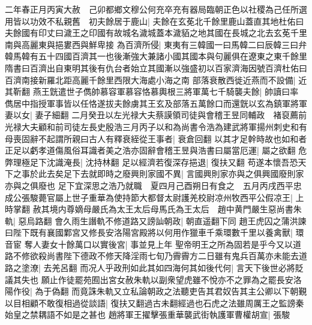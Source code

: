 二年春正月丙寅大赦　己卯都鄉文穆公何充卒充有器局臨朝正色以社稷為己任所選用皆以功效不私親舊　初夫餘居于鹿山|{
	夫餘在玄莬北千餘里鹿山蓋直其地杜佑曰夫餘國有印丈曰濊王之印國有故城名濊城蓋本濊貊之地其國在長城之北去玄莬千里南與高麗東與挹婁西與鮮卑接}
為百濟所侵|{
	東夷有三韓國一曰馬韓二曰辰韓三曰弁韓馬韓有五十四國百濟其一也後漸強大兼諸小國其國本與句麗俱在遼東之東千餘里隋書曰百濟出自東明其後有仇台者始立其國漸以強盛初以百家濟海因號百濟杜佑曰百濟南接新羅北距高麗千餘里西限大海處小海之南}
部落衰散西徙近燕而不設備|{
	近其靳翻}
燕王皝遣世子儁帥慕容軍慕容恪慕輿根三將軍萬七千騎襲夫餘|{
	帥讀曰率}
儁居中指授軍事皆以任恪遂拔夫餘虜其王玄及部落五萬餘口而還皝以玄為鎮軍將軍妻以女|{
	妻子細翻}
二月癸丑以左光禄大夫蔡謨領司徒與會稽王昱同輔政　褚裒薦前光禄大夫顧和前司徒左長史殷浩三月丙子以和為尚書令浩為建武將軍揚州刺史和有母喪固辭不起謂所親曰古人有釋衰絰從王事者|{
	衰倉回翻}
以其才足幹時故也如和者正足以虧孝道傷風俗耳識者美之浩亦固辭會稽王昱與浩書曰屬當厄運|{
	屬之欲翻}
危弊理極足下沈識淹長|{
	沈持林翻}
足以經濟若復深存挹退|{
	復扶又翻}
苟遂本懷吾恐天下之事於此去矣足下去就即時之廢興則家國不異|{
	言國興則家亦與之俱興國廢則家亦與之俱廢也}
足下宜深思之浩乃就職　夏四月己酉朔日有食之　五月丙戌西平忠成公張駿薨官屬上世子重華為使持節大都督太尉護羌校尉凉州牧西平公假凉王|{
	上時掌翻}
赦其境内尊嫡母嚴氏為太王太后母馬氏為王太后　趙中黄門嚴生惡尚書朱軌|{
	惡烏路翻}
會久雨生譖軌不修道路又謗訕朝政|{
	朝直遥翻下同}
趙王虎囚之蒲洪諫曰陛下既有襄國鄴宮又修長安洛陽宮殿將以何用作獵車千乘環數千里以養禽獸|{
	環音宦}
奪人妻女十餘萬口以實後宮|{
	事並見上年}
聖帝明王之所為固若是乎今又以道路不修欲殺尚書陛下德政不修天降淫雨七旬乃霽霽方二日雖有鬼兵百萬亦未能去道路之塗潦|{
	去羌呂翻}
而况人乎政刑如此其如四海何其如後代何|{
	言天下後世必將貶議其失也}
願止作徒罷苑囿出宮女赦朱軌以副衆望虎雖不悅亦不之罪為之罷長安洛陽作役|{
	為于偽翻}
而竟誅朱軌又立私論朝政之法聽吏告其君奴告其主公卿以下朝覲以目相顧不敢復相過從談語|{
	復扶又翻過古未翻經過也石虎之法雖周厲王之監謗秦始皇之禁耦語不如是之甚也}
趙將軍王擢擊張重華襲武街執護軍曹權胡宣|{
	張駿}


